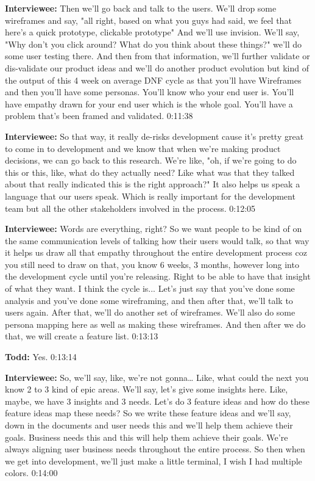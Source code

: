\textbf{Interviewee:} Then we'll go back and talk to the users. We'll drop some wireframes and say, "all right, based on what you guys had said, we feel that here's a quick prototype, clickable prototype" And we'll use invision.  We'll say, "Why don't you click around? What do you think about these things?" we'll do some user testing there.  And then from that information, we'll further validate or dis-validate our product ideas and we'll do another product evolution but kind of the output of this 4 week on average DNF cycle as that you'll have Wireframes and then you'll have some personas. You'll know who your end user is.  You'll have empathy drawn for your end user which is the whole goal. You'll have a problem that's been framed and validated.   0:11:38

\textbf{Interviewee:} So that way, it really de-risks development cause it's pretty great to come in to development and we know that when we're making product decisions, we can go back to this research.  We're like, "oh, if we're going to do this or this, like, what do they actually need? Like what was that they talked about that really indicated this is the right approach?" It also helps us speak a language that our users speak.  Which is really important for the development team but all the other stakeholders involved in the process.  0:12:05

\textbf{Interviewee:} Words are everything, right? So we want people to be kind of on the same communication levels of talking how their users would talk, so that way it helps us draw all that empathy throughout the entire development process coz you still need to draw on that, you know 6 weeks, 3 months, however long into the development cycle until you're releasing. Right to be able to have that insight of what they want. I think the cycle is... Let's just say that you've done some analysis and you've done some wireframing, and then after that, we'll talk to users again.  After that, we'll do another set of wireframes. We'll also do some persona mapping here as well as making these wireframes.  And then after we do that, we will create a feature list.  0:13:13

\textbf{Todd:} Yes.  0:13:14

\textbf{Interviewee:} So, we'll say, like, we're not gonna…  Like, what could the next you know 2 to 3 kind of epic areas. We'll say, let's give some insights here.  Like, maybe, we have 3 insights and 3 needs.  Let's do 3 feature ideas and how do these feature ideas map these needs?  So we write these feature ideas and we'll say, down in the documents and user needs this and we'll help them achieve their goals.  Business needs this and this will help them achieve their goals.  We're always aligning user business needs throughout the entire process. So then when we get into development, we'll just make a little terminal, I wish I had multiple colors.  0:14:00

